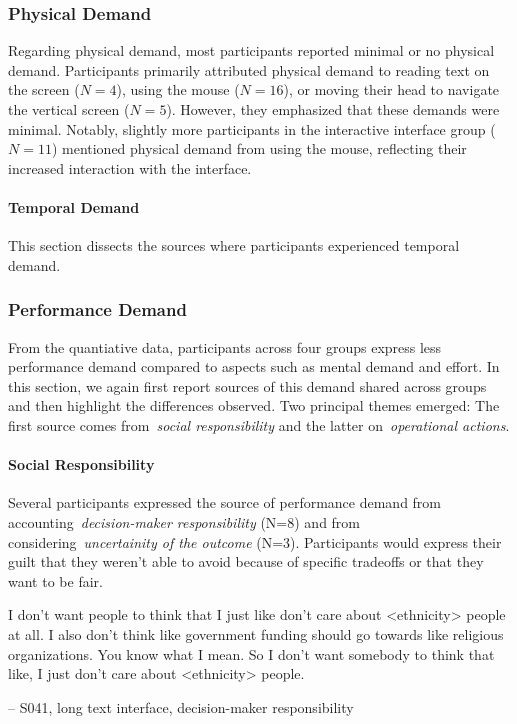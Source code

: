 
\subsubsection{Physical Demand}
Regarding physical demand, most participants reported minimal or no physical demand. Participants primarily attributed physical demand to reading text on the screen ($N=4$), using the mouse ($N=16$), or moving their head to navigate the vertical screen ($N=5$). However, they emphasized that these demands were minimal. Notably, slightly more participants in the interactive interface group ($N=11$) mentioned physical demand from using the mouse, reflecting their increased interaction with the interface.

\paragraph{Temporal Demand} This section dissects the sources where participants experienced temporal demand.


\subsubsection{Performance Demand} 
From the quantiative data, participants across four groups express less performance demand compared to aspects such as mental demand and effort. In this section, we again first report sources of this demand shared across groups and then highlight the differences observed. Two principal themes emerged: The first source comes from~\textit{social responsibility} and the latter on~\textit{operational actions}.

\paragraph{Social Responsibility}
Several participants expressed the source of performance demand from accounting~\textit{decision-maker responsibility} (N=8) and from considering~\textit{uncertainity of the outcome} (N=3). Participants would express their guilt that they weren't able to avoid because of specific tradeoffs or that they want to be fair.

\begin{displayquote}
    I don't want people to think that I just like don't care about <ethnicity> people at all. I also don't think like government funding should go towards like religious organizations. You know what I mean. So I don't want somebody to think that like, I just don't care about <ethnicity> people.
    
\noindent \hfill -- S041, long text interface, decision-maker responsibility
\end{displayquote}

